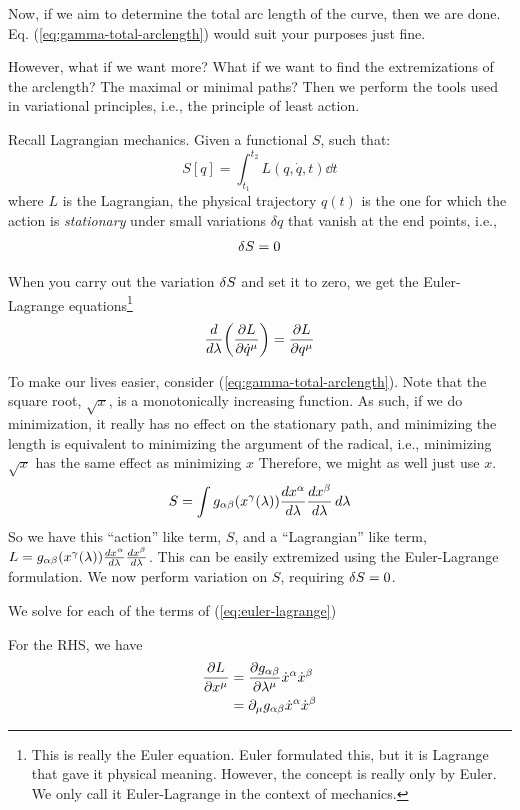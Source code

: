 	Now, if we aim to determine the total arc length of the curve, then we are done. Eq. (\ref{eq:gamma-total-arclength})
	would suit your purposes just fine.

	However, what if we want more? What if we want to find the extremizations
	of the arclength? The maximal or minimal paths? Then we perform the tools used in variational principles, i.e.,
	the principle of least action.

	Recall Lagrangian mechanics. Given a functional $S$, such that:
	\[
		S[q] = \int_{t_1}^{t_2} L(q,\dot{q},t)\dd{t}
	\]
	where $L$ is the Lagrangian,
	the physical trajectory $q(t)$ is the one for which the action is \textit{stationary}
	under small variations $\delta q$ that vanish at the end points, i.e.,
	\[
		\var{S} = 0
	\]

	When you carry out the variation $\var{S}$ and set it to zero, we get the Euler-Lagrange equations\footnote{
		This is really the Euler equation. Euler formulated this, but it is Lagrange that gave it physical meaning.
		However, the concept is really only by Euler. We only call it Euler-Lagrange in the context of mechanics.
	}
	\begin{equation}
		\label{eq:euler-lagrange}
	    \dv{}{\lambda}
		\pqty{
			\pdv{L}{\dot q^\mu}  
		}
		=
		\pdv{L}{q^\mu}
	\end{equation}

	To make our lives easier, consider (\ref{eq:gamma-total-arclength}). Note that the square root, $\sqrt{x}$,
	is a monotonically increasing function.  As such, if we do minimization, it really has no 
	effect on the stationary path, and minimizing the length is equivalent to minimizing the argument of the radical, i.e.,
	minimizing $\sqrt{x}$ has the same effect as minimizing $x$
	Therefore, we might as well just use $x$.
	\begin{equation}
		\label{eq:gamma-action}
		S
		= \int
		{
			g_{\alpha\beta}(x^\gamma(\lambda))
			\dv{x^\alpha}{\lambda} 
			\dv{x^\beta}{\lambda} 
		}
		\dd{\lambda}
	\end{equation}
	So we have this ``action'' like term, $S$, and a ``Lagrangian'' like term, 
	$
			L=g_{\alpha\beta}(x^\gamma(\lambda))
			\dv{x^\alpha}{\lambda} 
			\dv{x^\beta}{\lambda} 
	$. This can be easily extremized using the Euler-Lagrange formulation.
	We now perform variation on $S$, requiring $\var{S}= 0$.

	We solve for each of the terms of (\ref{eq:euler-lagrange})

	For the RHS, we have
	\begin{align*}
	    \pdv{L}{x^\mu} 
		&= 
		\pdv{g_{\alpha\beta}}{\lambda^\mu}
		\dot{x}^\alpha
		\dot{x}^\beta\\
		&=
		\partial_\mu g_{\alpha\beta}
		\dot{x}^\alpha
		\dot{x}^\beta
	\end{align*}

